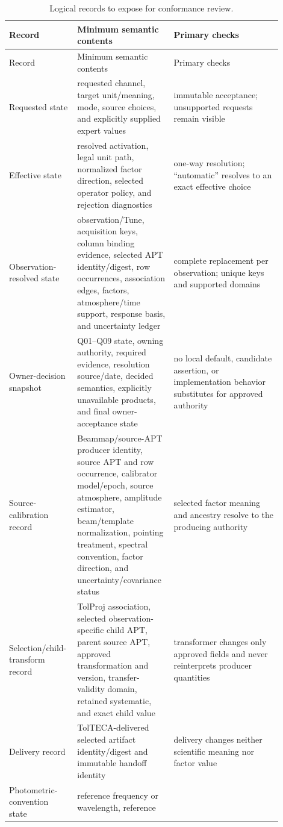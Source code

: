 \documentclass[10pt]{article}
\begin{document}
\begin{longtable}{L{0.20\linewidth}L{0.32\linewidth}L{0.38\linewidth}}
\caption{Logical records to expose for conformance review.}\label{tab:eng-records}\\
\toprule
Record & Minimum semantic contents & Primary checks \\
\midrule
\endfirsthead
\toprule
Record & Minimum semantic contents & Primary checks \\
\midrule
\endhead
Requested state & requested channel, target unit/meaning, mode, source choices,
and explicitly supplied expert values & immutable acceptance; unsupported
requests remain visible \\
Effective state & resolved activation, legal unit path, normalized factor
direction, selected operator policy, and rejection diagnostics & one-way
resolution; ``automatic'' resolves to an exact effective choice \\
Observation-resolved state & observation/Tune, acquisition keys, column
binding evidence, selected APT identity/digest, row occurrences, association
edges, factors, atmosphere/time support, response basis, and uncertainty
ledger & complete replacement per observation; unique keys and supported
domains \\
Owner-decision snapshot & Q01--Q09 state, owning authority, required evidence,
resolution source/date, decided semantics, explicitly unavailable products,
and final owner-acceptance state & no local default, candidate assertion, or
implementation behavior substitutes for approved authority \\
Source-calibration record & Beammap/source-APT producer identity, source APT and
row occurrence, calibrator model/epoch, source atmosphere, amplitude
estimator, beam/template normalization, pointing treatment, spectral
convention, factor direction, and uncertainty/covariance status & selected
factor meaning and ancestry resolve to the producing authority \\
Selection/child-transform record & TolProj association, selected
observation-specific child APT, parent source APT, approved transformation and
version, transfer-validity domain, retained systematic, and exact child value
& transformer changes only approved fields and never reinterprets producer
quantities \\
Delivery record & TolTECA-delivered selected artifact identity/digest and
immutable handoff identity & delivery changes neither scientific meaning nor
factor value \\
Photometric-convention state & reference frequency or wavelength, reference

\end{longtable}
\end{document}
